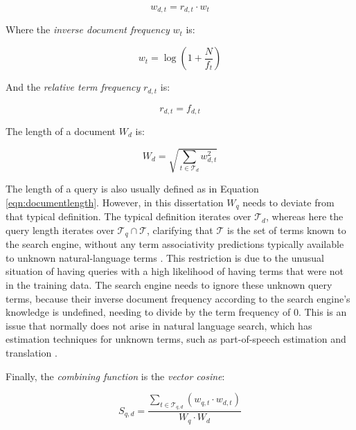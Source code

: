 \documentclass[11pt]{ucthesis}
\theoremstyle{plain}
\theoremstyle{definition}
\begin{document}
\begin{equation}\label{eqn:tfidf}
w_{d,t} = r_{d,t} \cdot w_t
\end{equation}

Where the \emph{inverse document frequency} $w_t$ is:

\begin{equation}\label{eqn:inversedocumentfrequency}
w_t = \log{(1 + \frac{N}{f_t})}
\end{equation}

And the \emph{relative term frequency} $r_{d,t}$ is:

\begin{equation}\label{eqn:termfrequency}
r_{d,t} = f_{d,t}
\end{equation}

The length of a document $W_d$ is:

\begin{equation}\label{eqn:documentlength}
W_d = \sqrt{
  \sum_{t \in \mathcal{T}_d} w^2_{d,t}
}
\end{equation}

The length of a query is also usually defined as in Equation \ref{eqn:documentlength}.  However, in this dissertation $W_q$ needs to deviate from that typical definition.  The typical definition iterates over $\mathcal{T}_d$, whereas here the query length iterates over $\mathcal{T}_{q} \cap \mathcal{T}$, clarifying that $\mathcal{T}$ is the set of terms known to the search engine, without any term associativity predictions typically available to unknown natural-language terms \cite{manning:mitpress99}. This restriction is due to the unusual situation of having queries with a high likelihood of having terms that were not in the training data.  The search engine needs to ignore these unknown query terms, because their inverse document frequency according to the search engine's knowledge is undefined, needing to divide by the term frequency of 0.  This is an issue that normally does not arise in natural language search, which has estimation techniques for unknown terms, such as part-of-speech estimation \cite{tonkin:acro06} and translation \cite{cheng:sigir04}.

Finally, the \emph{combining function} is the \emph{vector cosine}:

\begin{equation}\label{eqn:vectorcosine}
S_{q,d} = \frac{
  \sum_{t \in \mathcal{T}_{q,d}}(w_{q,t} \cdot w_{d,t})
}{
  W_q \cdot W_d
}
\end{equation}
\end{document}
